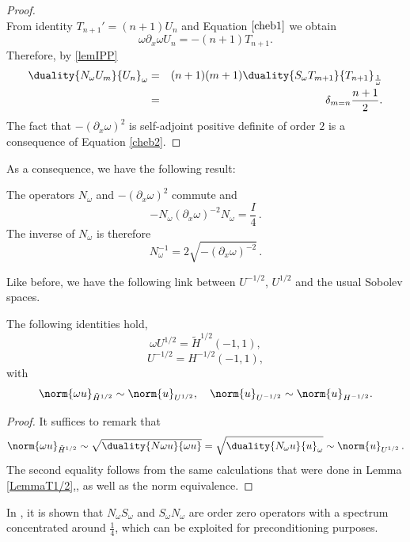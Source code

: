 \documentclass[a4paper]{article}
\begin{document}
	\begin{proof}
		\\
		From identity $T_{n+1}' = (n+1)U_n$ and Equation $\eqref{cheb1}$ we obtain
		\begin{equation*}
		\omega \partial_x \omega U_n = -(n+1) T_{n+1}.
		\end{equation*}
		Therefore, by \autoref{lemIPP}
		\begin{eqnarray*}
			\duality{N_\omega U_m}{U_n}_\omega & = & (n+1)(m+1)\duality{S_\omega T_{m+1}}{T_{n+1}}_\frac{1}{\omega}\\
			&=& \delta_{m=n} \frac{n+1}{2}.	
		\end{eqnarray*}
	The fact that $-(\partial_x \omega)^2$ is self-adjoint positive definite of order $2$ is a consequence of Equation \eqref{cheb2}.
	\end{proof}
	\noindent As a consequence, we have the following result:
	\begin{The} The operators $N_\omega$ and $-(\partial_x \omega)^2$ commute and 
		\[-N_\omega (\partial_x \omega)^{-2} N_{\omega} = \frac{I}{4}\,.\]
		The inverse of $N_\omega$ is therefore 
		\begin{equation}
		N_\omega^{-1} = 2\sqrt{-(\partial_x \omega)^{-2}}\,.
		\end{equation}
	\end{The}
	
	Like before, we have the following link between $U^{-1/2}$, $U^{1/2}$ and the usual Sobolev spaces. 
	\begin{Lem} The following identities hold, 
		\[\omega U^{1/2} = \tilde{H}^{1/2}(-1,1),\]
		\[ U^{-1/2} = H^{-1/2}(-1,1),\]
		with 
		\[\norm{\omega u}_{\tilde{H}^{1/2}} \sim \norm{u}_{U^{1/2}},\quad \norm{u}_{U^{-1/2}} \sim \norm{u}_{H^{-1/2}}.\]
		\label{lemU12H12}
	\end{Lem}
	\begin{proof} It suffices to remark that 
		\[ \norm{\omega u}_{\tilde{H}^{1/2}} \sim \sqrt{\duality{N\omega u}{\omega u}} = \sqrt{\duality{N_\omega u}{u}_\omega} \sim \norm{u}_{U^{1/2}}\,.\]
		The second equality follows from the same calculations that were done in Lemma \ref{LemmaT1/2},, as well as the norm equivalence. 
	\end{proof}
	
	
	In \cite{bruno2012second}, it is shown that $N_\omega S_\omega$ and $S_\omega N_\omega$ are order zero operators with a spectrum concentrated around $\frac{1}{4}$, which can be exploited for preconditioning purposes. 
	
\end{document}
